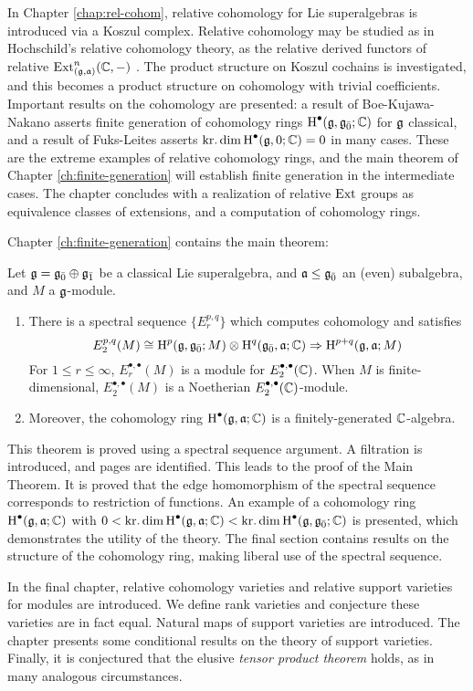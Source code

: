 In Chapter \ref{chap:rel-cohom}, relative cohomology for Lie superalgebras is introduced via a Koszul complex. Relative cohomology may be studied as in Hochschild's relative cohomology theory, as the relative derived functors of relative $\operatorname{Ext}_{(\mathfrak{g},\mathfrak{a})}^n(\mathbb{C},-)$ \cite{hochschild}. The product structure on Koszul cochains is investigated, and this becomes a product structure on cohomology with trivial coefficients. Important results on the cohomology are presented: a result of Boe-Kujawa-Nakano \cite{BKN-1} asserts finite generation of cohomology rings $\operatorname{H}^\bullet(\mathfrak{g},{\mathfrak{g}}_{\bar{0}};\mathbb{C})$ for $\mathfrak{g}$ classical, and a result of Fuks-Leites asserts $\operatorname{kr.dim} \operatorname{H}^\bullet(\mathfrak{g},0;\mathbb{C}) = 0$ in many cases. These are the extreme examples of relative cohomology rings, and the main theorem of Chapter \ref{ch:finite-generation} will establish finite generation in the intermediate cases. The chapter concludes with a realization of relative $\operatorname{Ext}$ groups as equivalence classes of extensions, and a computation of cohomology rings.

Chapter \ref{ch:finite-generation} contains the main theorem:
\begin{maintheorem}
  Let $\mathfrak{g} = {\mathfrak{g}}_{\bar{0}} \oplus {\mathfrak{g}}_{\bar{1}}$ be a classical Lie superalgebra, and $\mathfrak{a} \leq {\mathfrak{g}}_{\bar{0}}$ an (even) subalgebra, and $M$ a $\mathfrak{g}$-module.
  \begin{enumerate}[\indent\rm (a)]
    \item There is a spectral sequence $\{E_r^{p,q}\}$ which computes cohomology and satisfies
  \[
    E_2^{p,q}(M) \cong \operatorname{H}^p(\mathfrak{g},{\mathfrak{g}}_{\bar{0}};M) \otimes \operatorname{H}^q({\mathfrak{g}}_{\bar{0}},\mathfrak{a};\mathbb{C}) \Rightarrow \operatorname{H}^{p+q}(\mathfrak{g},\mathfrak{a};M)
  \]
  For $1 \leq r \leq \infty$, $E_r^{\bullet,\bullet}(M)$ is a module for $E_2^{\bullet,\bullet}(\mathbb{C})$. When $M$ is finite-dimensional, $E_2^{\bullet,\bullet}(M)$ is a Noetherian $E_2^{\bullet,\bullet}(\mathbb{C})$-module.
    \item Moreover, the cohomology ring $\operatorname{H}^\bullet(\mathfrak{g},\mathfrak{a};\mathbb{C})$ is a finitely-generated $\mathbb{C}$-algebra.
  \end{enumerate}
\end{maintheorem}
This theorem is proved using a spectral sequence argument. A filtration is introduced, and pages are identified. This leads to the proof of the Main Theorem. It is proved that the edge homomorphism of the spectral sequence corresponds to restriction of functions. An example of a cohomology ring $\operatorname{H}^\bullet(\mathfrak{g},\mathfrak{a};\mathbb{C})$ with $0 < \operatorname{kr.dim} \operatorname{H}^\bullet(\mathfrak{g},\mathfrak{a};\mathbb{C}) < \operatorname{kr.dim} \operatorname{H}^\bullet(\mathfrak{g},{\mathfrak{g}}_{\bar{0}};\mathbb{C})$ is presented, which demonstrates the utility of the theory. The final section contains results on the structure of the cohomology ring, making liberal use of the spectral sequence.

In the final chapter, relative cohomology varieties and relative support varieties for modules are introduced. We define rank varieties and conjecture these varieties are in fact equal. Natural maps of support varieties are introduced. The chapter presents some conditional results on the theory of support varieties. Finally, it is conjectured that the elusive \emph{tensor product theorem} holds, as in many analogous circumstances.




